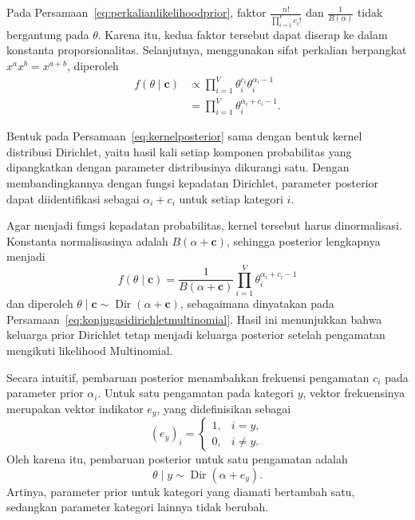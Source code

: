 Pada Persamaan~\eqref{eq:perkalianlikelihoodprior}, faktor
$\frac{n!}{\prod_{i=1}^{V}c_i!}$ dan $\frac{1}{B(\alpha)}$
tidak bergantung pada $\theta$. Karena itu, kedua faktor tersebut
dapat diserap ke dalam konstanta proporsionalitas. Selanjutnya,
menggunakan sifat perkalian berpangkat
$x^a x^b=x^{a+b}$, diperoleh
\begin{align}
f(\theta\mid\bm{c})
&\propto
\prod_{i=1}^{V}
\theta_i^{c_i}\theta_i^{\alpha_i-1}
\nonumber\\
&=
\prod_{i=1}^{V}
\theta_i^{\alpha_i+c_i-1}.
\label{eq:kernelposterior}
\end{align}

Bentuk pada Persamaan~\eqref{eq:kernelposterior} sama dengan
bentuk kernel distribusi Dirichlet, yaitu hasil kali setiap
komponen probabilitas yang dipangkatkan dengan parameter
distribusinya dikurangi satu. Dengan membandingkannya dengan
fungsi kepadatan Dirichlet, parameter posterior dapat diidentifikasi
sebagai $\alpha_i+c_i$ untuk setiap kategori $i$.

Agar menjadi fungsi kepadatan probabilitas, kernel
tersebut harus dinormalisasi. Konstanta normalisasinya adalah
$B(\alpha+\bm{c})$, sehingga posterior lengkapnya menjadi
\begin{equation}
f(\theta\mid\bm{c})
=
\frac{1}{B(\alpha+\bm{c})}
\prod_{i=1}^{V}
\theta_i^{\alpha_i+c_i-1}
\label{eq:posteriorlengkap}
\end{equation}
dan diperoleh
$\theta\mid\bm{c}\sim\operatorname{Dir}(\alpha+\bm{c})$,
sebagaimana dinyatakan pada
Persamaan~\eqref{eq:konjugasidirichletmultinomial}. Hasil ini
menunjukkan bahwa keluarga prior Dirichlet tetap menjadi keluarga
posterior setelah pengamatan mengikuti likelihood Multinomial.


Secara intuitif, pembaruan posterior menambahkan frekuensi
pengamatan $c_i$ pada parameter prior $\alpha_i$. Untuk satu
pengamatan pada kategori $y$, vektor frekuensinya merupakan
vektor indikator $e_y$, yang didefinisikan sebagai
\[
(e_y)_i=
\begin{cases}
1, & i=y,\\
0, & i\neq y.
\end{cases}
\]
Oleh karena itu, pembaruan posterior untuk satu pengamatan adalah
\begin{equation}
\theta\mid y
\sim\operatorname{Dir}(\alpha+e_y).
\label{eq:posterioronehot}
\end{equation}
Artinya, parameter prior untuk kategori yang diamati bertambah
satu, sedangkan parameter kategori lainnya tidak berubah.

